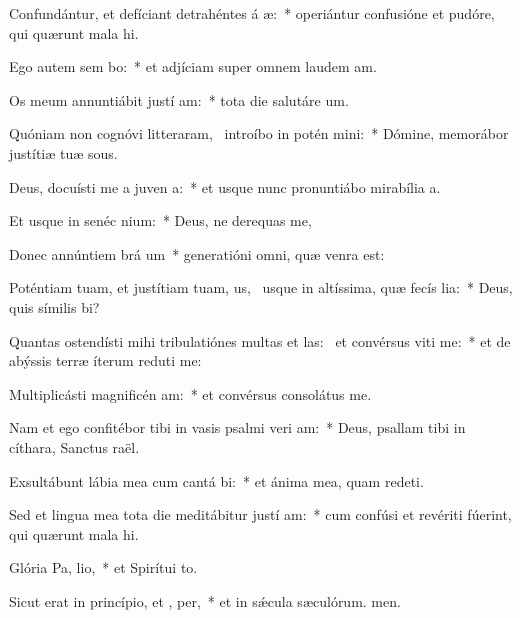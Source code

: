 \item Confundántur, et defíciant detrahéntes á æ:~* operiántur confusióne et pudóre, qui quærunt mala hi.
\item Ego autem sem bo:~* et adjíciam super omnem laudem am.
\item Os meum annuntiábit justí am:~* tota die salutáre um.
\item Quóniam non cognóvi litteraram,~\pscross{} introíbo in potén mini:~* Dómine, memorábor justítiæ tuæ sous.
\item Deus, docuísti me a juven a:~* et usque nunc pronuntiábo mirabília a.
\item Et usque in senéc  nium:~* Deus, ne derequas me,
\item Donec annúntiem brá um~* generatióni omni, quæ venra est:
\item Poténtiam tuam, et justítiam tuam, us,~\pscross{} usque in altíssima, quæ fecís lia:~* Deus, quis símilis bi?
\item Quantas ostendísti mihi tribulatiónes multas et las:~\pscross{} et convérsus viti me:~* et de abýssis terræ íterum reduti me:
\item Multiplicásti magnificén am:~* et convérsus consolátus  me.
\item Nam et ego confitébor tibi in vasis psalmi veri am:~* Deus, psallam tibi in cíthara, Sanctus raël.
\item Exsultábunt lábia mea cum cantá bi:~* et ánima mea, quam redeti.
\item Sed et lingua mea tota die meditábitur justí am:~* cum confúsi et revériti fúerint, qui quærunt mala hi.
\item Glória Pa,  lio,~* et Spirítui to.
\item Sicut erat in princípio, et ,  per,~* et in sǽcula sæculórum. men.
